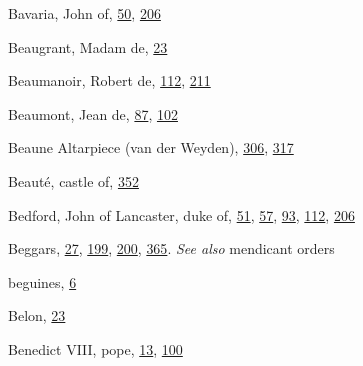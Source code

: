 Bavaria, John of,
\protect\hyperlink{09_Chapter_Two__THE_CRAVING_FOR_A_M.xhtmlux5cux23page_50}{50},
\protect\hyperlink{14_Chapter_Seven__THE_PIOUS_PERSONA.xhtmlux5cux23page_206}{206}

Beaugrant, Madam de,
\protect\hyperlink{08_Chapter_One__THE_PASSIONATE_INTE.xhtmlux5cux23page_23}{23}

Beaumanoir, Robert de,
\protect\hyperlink{10_Chapter_Three__THE_HEROIC_DREAM.xhtmlux5cux23page_112}{112},
\protect\hyperlink{14_Chapter_Seven__THE_PIOUS_PERSONA.xhtmlux5cux23page_211}{211}

Beaumont, Jean de,
\protect\hyperlink{10_Chapter_Three__THE_HEROIC_DREAM.xhtmlux5cux23page_87}{87},
\protect\hyperlink{10_Chapter_Three__THE_HEROIC_DREAM.xhtmlux5cux23page_102}{102}

Beaune Altarpiece (van der Weyden),
\protect\hyperlink{20_ILLUSTRATIONS_FOLLOW_PAGE.xhtmlux5cux23page_306}{306},
\protect\hyperlink{20_ILLUSTRATIONS_FOLLOW_PAGE.xhtmlux5cux23page_317}{317}

Beauté, castle of,
\protect\hyperlink{21_Chapter_Thirteen__IMAGE_AND_WORD.xhtmlux5cux23page_352}{352}

Bedford, John of Lancaster, duke of,
\protect\hyperlink{09_Chapter_Two__THE_CRAVING_FOR_A_M.xhtmlux5cux23page_51}{51},
\protect\hyperlink{09_Chapter_Two__THE_CRAVING_FOR_A_M.xhtmlux5cux23page_57}{57},
\protect\hyperlink{10_Chapter_Three__THE_HEROIC_DREAM.xhtmlux5cux23page_93}{93},
\protect\hyperlink{10_Chapter_Three__THE_HEROIC_DREAM.xhtmlux5cux23page_112}{112},
\protect\hyperlink{14_Chapter_Seven__THE_PIOUS_PERSONA.xhtmlux5cux23page_206}{206}

Beggars,
\protect\hyperlink{08_Chapter_One__THE_PASSIONATE_INTE.xhtmlux5cux23page_27}{27},
\protect\hyperlink{13_Chapter_Six__THE_DEPICTION_OF_TH.xhtmlux5cux23page_199}{199},
\protect\hyperlink{13_Chapter_Six__THE_DEPICTION_OF_TH.xhtmlux5cux23page_200}{200},
\protect\hyperlink{21_Chapter_Thirteen__IMAGE_AND_WORD.xhtmlux5cux23page_365}{365}.
\emph{See also} mendicant orders

beguines,
\protect\hyperlink{08_Chapter_One__THE_PASSIONATE_INTE.xhtmlux5cux23page_6}{6}

Belon,
\protect\hyperlink{08_Chapter_One__THE_PASSIONATE_INTE.xhtmlux5cux23page_23}{23}

Benedict VIII, pope,
\protect\hyperlink{08_Chapter_One__THE_PASSIONATE_INTE.xhtmlux5cux23page_13}{13},
\protect\hyperlink{10_Chapter_Three__THE_HEROIC_DREAM.xhtmlux5cux23page_100}{100}

